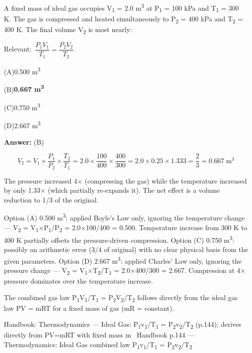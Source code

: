 \documentclass[11pt]{article}
\newcommand{\correct}[1]{\textbf{#1}\;{\color{accent}$\checkmark$}}
\newcommand{\optline}[2]{\par\noindent\hspace{1.2em}(#1)\hspace{0.6em}#2}
\begin{document}
A fixed mass of ideal gas occupies V\textsubscript{1} = 2.0 m\textsuperscript{3} at P\textsubscript{1} = 100 kPa and T\textsubscript{1} = 300 K. The gas is compressed and heated simultaneously to P\textsubscript{2} = 400 kPa and T\textsubscript{2} = 400 K. The final volume V\textsubscript{2} is most nearly:\par\vspace{3pt}
{\small\color{soft}Relevant:}\ $\dfrac{P_1 V_1}{T_1} = \dfrac{P_2 V_2}{T_2}$\par\vspace{3pt}
\optline{A}{0.500 m\textsuperscript{3}}
\optline{B}{\correct{0.667 m\textsuperscript{3}}}
\optline{C}{0.750 m\textsuperscript{3}}
\optline{D}{2.667 m\textsuperscript{3}}
\par\vspace{3pt}
\vspace{2pt}\par\noindent\colorbox{boxbg}{\parbox{\dimexpr\linewidth-2\fboxsep\relax}{%
\vspace{2pt}\textbf{Answer:} (B)\par\vspace{2pt}
{\small \[V_2 = V_1 \times \frac{P_1}{P_2} \times \frac{T_2}{T_1} = 2.0 \times \frac{100}{400} \times \frac{400}{300} = 2.0 \times 0.25 \times 1.333 = \frac{2}{3} = 0.667\;\text{m}^3\]

The pressure increased 4$\times$ (compressing the gas) while the temperature increased by only 1.33$\times$ (which partially re-expands it). The net effect is a volume reduction to 1/3 of the original.

Option (A) 0.500 m\textsuperscript{3}: applied Boyle's Law only, ignoring the temperature change --- V\textsubscript{2} = V\textsubscript{1}$\times$P\textsubscript{1}/P\textsubscript{2} = 2.0$\times$100/400 = 0.500. Temperature increase from 300 K to 400 K partially offsets the pressure-driven compression. Option (C) 0.750 m\textsuperscript{3}: possibly an arithmetic error (3/4 of original) with no clear physical basis from the given parameters. Option (D) 2.667 m\textsuperscript{3}: applied Charles' Law only, ignoring the pressure change --- V\textsubscript{2} = V\textsubscript{1}$\times$T\textsubscript{2}/T\textsubscript{1} = 2.0$\times$400/300 = 2.667. Compression at 4$\times$ pressure dominates over the temperature increase.

The combined gas law P\textsubscript{1}V\textsubscript{1}/T\textsubscript{1} = P\textsubscript{2}V\textsubscript{2}/T\textsubscript{2} follows directly from the ideal gas law PV = mRT for a fixed mass of gas (mR = constant).}\par\vspace{2pt}
{\footnotesize\color{soft}Handbook: Thermodynamics --- Ideal Gas: P\textsubscript{1}v\textsubscript{1}/T\textsubscript{1} = P\textsubscript{2}v\textsubscript{2}/T\textsubscript{2} (p.144); derives directly from PV=mRT with fixed mass m \textbullet\ Handbook p.144 --- Thermodynamics: Ideal Gas combined law P\textsubscript{1}v\textsubscript{1}/T\textsubscript{1} = P\textsubscript{2}v\textsubscript{2}/T\textsubscript{2}}\vspace{2pt}
}}
\vspace{9pt}
\end{document}
